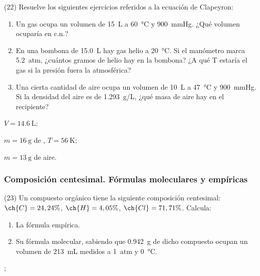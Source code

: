 \documentclass[10pt]{article}
\begin{document}
\begin{multicols}{2}
\begin{exercise}
  (22) Resuelve los siguientes ejercicios referidos a la ecuación de Clapeyron:
  \begin{enumerate}
    \item Un gas ocupa un volumen de \SI{15}{\liter} a \SI{60}{\celsius} y \SI{900}{\mmHg}. ¿Qué volumen ocuparía en c.n.?
    \item En una bombona de \SI{15.0}{\liter} hay gas helio a \SI{20}{\celsius}. Si el manómetro marca \SI{5.2}{atm}, ¿cuántos gramos de helio hay en la bombona? ¿A qué T estaría el gas si la presión fuera la atmosférica?
    \item Una cierta cantidad de aire ocupa un volumen de \SI{10}{\liter} a \SI{47}{\celsius} y \SI{900}{\mmHg}. Si la densidad del aire es de \SI{1.293}{g/L}, ¿qué masa de aire hay en el recipiente?
  \end{enumerate}
\end{exercise}
\begin{solution}
  \begin{enumerate*}
    \item \( V = \SI{14.6}{\liter} \); \item \( m = \SI{16}{\gram} \) de , \( T = \SI{56}{\kelvin} \); \item \( m = \SI{13}{\gram} \) de aire.
  \end{enumerate*}
\end{solution}





\subsubsection{Composición centesimal. Fórmulas moleculares y empíricas}

\begin{exercise}
  (23) Un compuesto orgánico tiene la siguiente composición centesimal: \( \ch{C} = 24,24\% \), \( \ch{H} = 4,05\% \), \( \ch{Cl} = 71,71\% \). Calcula: %
  \begin{enumerate}
    \item La fórmula empírica.
    \item Su fórmula molecular, sabiendo que \SI{0.942}{\gram} de dicho compuesto ocupan un volumen de \SI{213}{\milli\liter} medidos a \SI{1}{atm} y \SI{0}{\celsius}.
  \end{enumerate}
\end{exercise}
\begin{solution}
  \begin{enumerate*}
    \item {};
    \item {}
  \end{enumerate*}


\end{solution}
\end{multicols}
\end{document}
